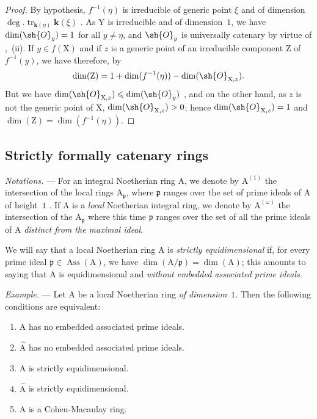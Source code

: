 \begin{proof}
By hypothesis, $f^{-1}(\eta)$ is irreducible of generic point $\xi$ and of dimension $\deg.\operatorname{tr}_{\boldsymbol{k}(\eta)}\boldsymbol{k}(\xi)$ .
As $\mathrm{Y}$ is irreducible and of dimension~$1$, we have $\dim(\sh{O}_y)=1$ for all $y\neq\eta$, and $\sh{O}_y$ is universally catenary by virtue of ,~(ii).
If $y\in f(\mathrm{X})$ and if $z$ is a generic point of an irreducible component $\mathrm{Z}$ of $f^{-1}(y)$, we have therefore, by 
\[
  \dim(\mathrm{Z})=1+\dim(f^{-1}(\eta))-\dim(\sh{O}_{\mathrm{X},z}).
\]
But we have $\dim(\sh{O}_{\mathrm{X},z})\leqslant\dim(\sh{O}_y)$ , and on the other hand, as $z$ is not the generic point of $\mathrm{X}$, $\dim(\sh{O}_{\mathrm{X},z})>0$; hence $\dim(\sh{O}_{\mathrm{X},z})=1$ and $\dim(\mathrm{Z})=\dim(f^{-1}(\eta))$.
\end{proof}


\newpage %
\subsection{Strictly formally catenary rings}
\label{subsection:IV.7.2}

\begin{env}[7.2.1]
\label{IV.7.2.1}
\emph{Notations.} ---
For an integral Noetherian ring $\mathrm{A}$, we denote by $\mathrm{A}^{(1)}$ the intersection of the local rings $\mathrm{A}_\mathfrak{p}$, where $\mathfrak{p}$ ranges over the set of prime ideals of $\mathrm{A}$ of height~$1$ .
If $\mathrm{A}$ is a \emph{local} Noetherian integral ring, we denote by $\mathrm{A}^{(\omega)}$ the intersection of the $\mathrm{A}_\mathfrak{p}$ where this time $\mathfrak{p}$ ranges over the set of all the prime ideals of $\mathrm{A}$ \emph{distinct from the maximal ideal}.

We will say that a local Noetherian ring $\mathrm{A}$ is \emph{strictly equidimensional} if, for every prime ideal $\mathfrak{p}\in\operatorname{Ass}(\mathrm{A})$, we have $\dim(\mathrm{A}/\mathfrak{p})=\dim(\mathrm{A})$; this amounts to saying that $\mathrm{A}$ is equidimensional and \emph{without embedded associated prime ideals}.
\end{env}

\begin{env}[7.2.1.1]
\label{IV.7.2.1.1}
\emph{Example.} ---
Let $\mathrm{A}$ be a local Noetherian ring \emph{of dimension}~$1$.
Then the following conditions are equivalent:
\begin{enumerate}[label=\emph{\alph*)}]
  \item $\mathrm{A}$ has no embedded associated prime ideals.
  \item[\emph{a$'$)}] $\widehat{\mathrm{A}}$ has no embedded associated prime ideals.
  \item $\mathrm{A}$ is strictly equidimensional.
  \item[\emph{b$'$)}] $\widehat{\mathrm{A}}$ is strictly equidimensional.
  \item $\mathrm{A}$ is a Cohen-Macaulay ring.
\end{enumerate}
\end{env}

